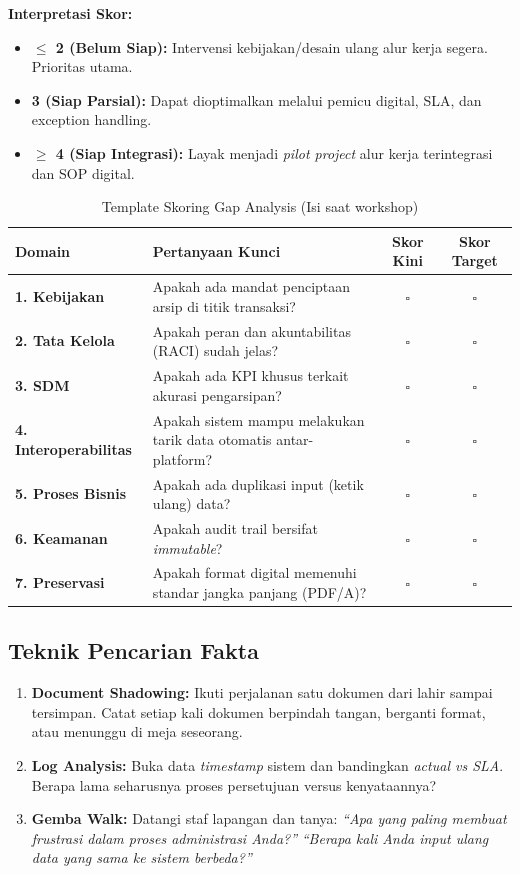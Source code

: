 \documentclass[11pt,a4paper]{article}
\begin{document}
\textbf{Interpretasi Skor:}
\begin{itemize}
    \item \textbf{$\leq$ 2 (Belum Siap):} Intervensi kebijakan/desain ulang alur kerja segera. Prioritas utama.
    \item \textbf{3 (Siap Parsial):} Dapat dioptimalkan melalui pemicu digital, SLA, dan exception handling.
    \item \textbf{$\geq$ 4 (Siap Integrasi):} Layak menjadi \textit{pilot project} alur kerja terintegrasi dan SOP digital.
\end{itemize}

\begin{table}[h!]
\centering\small
\caption*{Template Skoring Gap Analysis (Isi saat workshop)}
\begin{tabularx}{\textwidth}{@{} l X c c @{}}
\toprule
\textbf{Domain} & \textbf{Pertanyaan Kunci} & \textbf{Skor Kini} & \textbf{Skor Target} \\
\midrule
\rowcolor{plnblue!5}
\textbf{1. Kebijakan} & Apakah ada mandat penciptaan arsip di titik transaksi? & $\square$ & $\square$ \\
\textbf{2. Tata Kelola} & Apakah peran dan akuntabilitas (RACI) sudah jelas? & $\square$ & $\square$ \\
\rowcolor{plnblue!5}
\textbf{3. SDM} & Apakah ada KPI khusus terkait akurasi pengarsipan? & $\square$ & $\square$ \\
\textbf{4. Interoperabilitas} & Apakah sistem mampu melakukan tarik data otomatis antar-platform? & $\square$ & $\square$ \\
\rowcolor{plnblue!5}
\textbf{5. Proses Bisnis} & Apakah ada duplikasi input (ketik ulang) data? & $\square$ & $\square$ \\
\textbf{6. Keamanan} & Apakah audit trail bersifat \textit{immutable}? & $\square$ & $\square$ \\
\rowcolor{plnblue!5}
\textbf{7. Preservasi} & Apakah format digital memenuhi standar jangka panjang (PDF/A)? & $\square$ & $\square$ \\
\bottomrule
\end{tabularx}
\end{table}

\subsection{Teknik Pencarian Fakta}
\begin{enumerate}
    \item \textbf{Document Shadowing:} Ikuti perjalanan satu dokumen dari lahir sampai tersimpan. Catat setiap kali dokumen berpindah tangan, berganti format, atau menunggu di meja seseorang.
    \item \textbf{Log Analysis:} Buka data \textit{timestamp} sistem dan bandingkan \textit{actual vs SLA}. Berapa lama seharusnya proses persetujuan versus kenyataannya?
    \item \textbf{Gemba Walk:} Datangi staf lapangan dan tanya: \textit{``Apa yang paling membuat frustrasi dalam proses administrasi Anda?''} \textit{``Berapa kali Anda input ulang data yang sama ke sistem berbeda?''}
\end{enumerate}
\end{document}

